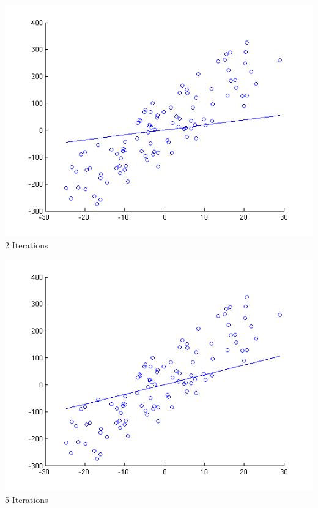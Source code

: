 \documentclass[a4paper]{article}
\begin{document}
\begin{center}
    \includegraphics[scale=0.5]{images/2.png}\\
    2 Iterations
\end{center}

\begin{center}
    \includegraphics[scale=0.5]{images/5.png}\\
    5 Iterations
\end{center}
\end{document}
